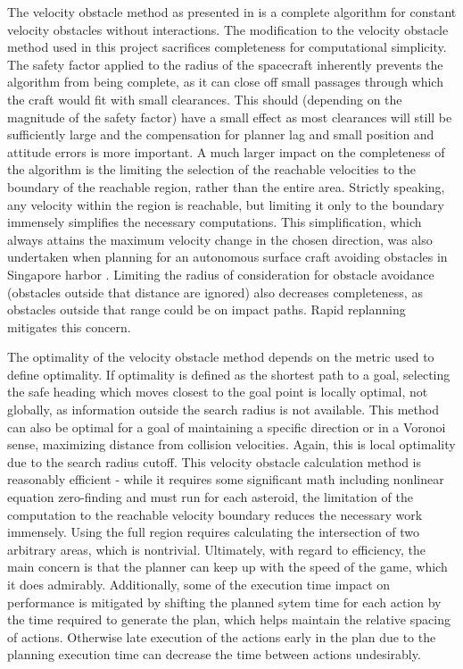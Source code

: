 \documentclass[10pt,final,conference]{IEEEtran}
\begin{document}
The velocity obstacle method as presented in \cite{fiorini1998motion} is a complete algorithm for constant velocity obstacles without interactions. The modification to the velocity obstacle method used in this project sacrifices completeness for computational simplicity. The safety factor applied to the radius of the spacecraft inherently prevents the algorithm from being complete, as it can close off small passages through which the craft would fit with small clearances. This should (depending on the magnitude of the safety factor) have a small effect as most clearances will still be sufficiently large and the compensation for planner lag and small position and attitude errors is more important. A much larger impact on the completeness of the algorithm is the limiting the selection of the reachable velocities to the boundary of the reachable region, rather than the entire area. Strictly speaking, any velocity within the region is reachable, but limiting it only to the boundary immensely simplifies the necessary computations. This simplification, which always attains the maximum velocity change in the chosen direction, was also undertaken when planning for an autonomous surface craft avoiding obstacles in Singapore harbor \citep{bandyophadyay2010simple}. Limiting the radius of consideration for obstacle avoidance (obstacles outside that distance are ignored) also decreases completeness, as obstacles outside that range could be on impact paths. Rapid replanning mitigates this concern.

The optimality of the velocity obstacle method depends on the metric used to define optimality. If optimality is defined as the shortest path to a goal, selecting the safe heading which moves closest to the goal point is locally optimal, not globally, as information outside the search radius is not available. This method can also be optimal for a goal of maintaining a specific direction or in a Voronoi sense, maximizing distance from collision velocities. Again, this is local optimality due to the search radius cutoff. This velocity obstacle calculation method is reasonably efficient - while it requires some significant math including nonlinear equation zero-finding and must run for each asteroid, the limitation of the computation to the reachable velocity boundary reduces the necessary work immensely. Using the full region requires calculating the intersection of two arbitrary areas, which is nontrivial. Ultimately, with regard to efficiency, the main concern is that the planner can keep up with the speed of the game, which it does admirably. Additionally, some of the execution time impact on performance is mitigated by shifting the planned sytem time for each action by the time required to generate the plan, which helps maintain the relative spacing of actions. Otherwise late execution of the actions early in the plan due to the planning execution time can decrease the time between actions undesirably.
\end{document}
